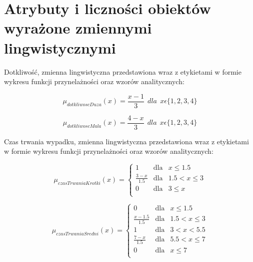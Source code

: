 \documentclass{classrep}
\begin{document}
\section{Atrybuty i liczności obiektów wyrażone zmiennymi lingwistycznymi}
Dotkliwość, zmienna lingwistyczna przedstawiona wraz z etykietami w formie wykresu funkcji przynelażności oraz wzorów analitycznych:


\begin{equation}
\mu _{dotkliwoscDuza}(x) =  \frac{x - 1}{3} \ \ dla \ \  x\epsilon \{1, 2, 3, 4\}
\end{equation}

\begin{equation}
\mu _{dotkliwoscMala}(x) =  \frac{4 - x}{3} \ \ dla \ \  x\epsilon \{1, 2, 3, 4\}
\end{equation}


Czas trwania wypadku, zmienna lingwistyczna przedstawiona wraz z etykietami w formie wykresu funkcji przynelażności oraz wzorów analitycznych:

\begin{equation}
\mu _{czasTrwaniaKrotki}(x) =  \left\{ \begin{array}{rcl}
 1 & \mbox{dla} & x  \leq 1.5 \\
\frac{3 - x}{1.5} & \mbox{dla} & 1.5 < x \leq 3\\
0 & \mbox{dla} & 3 \leq x\\
\end{array}\right.
\end{equation}

\begin{equation}
\mu _{czasTrwaniaSredni}(x) =  \left\{ \begin{array}{rcl}
 0 & \mbox{dla} & x  \leq 1.5 \\
\frac{x - 1.5}{1.5} & \mbox{dla} & 1.5 < x \leq 3\\
1 & \mbox{dla} & 3 < x < 5.5\\
\frac{7 - x}{1.5} & \mbox{dla} & 5.5 < x \leq 7\\
 0 & \mbox{dla} & x  \leq 7 \\
\end{array}\right.
\end{equation}
\end{document}
